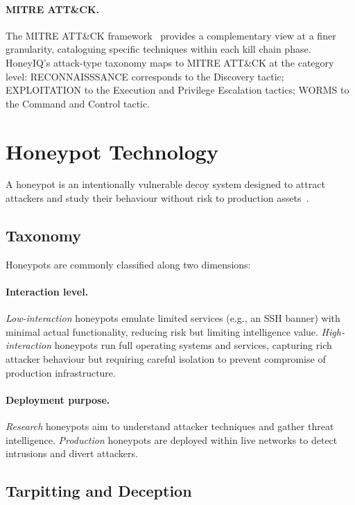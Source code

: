 \paragraph{MITRE ATT\&CK.}
The MITRE ATT\&CK framework~\citep{strom2018mitre} provides a complementary
view at a finer granularity, cataloguing specific techniques within each
kill chain phase.
HoneyIQ's attack-type taxonomy maps to MITRE ATT\&CK at the category level:
RECONNAISSSANCE corresponds to the Discovery tactic; EXPLOITATION to the
Execution and Privilege Escalation tactics; WORMS to the Command and
Control tactic.

\section{Honeypot Technology}
\label{sec:bg_honeypot}

A honeypot is an intentionally vulnerable decoy system designed to attract
attackers and study their behaviour without risk to production
assets~\citep{spitzner2003honeypot, cheswick1992evening}.

\subsection{Taxonomy}

Honeypots are commonly classified along two dimensions:

\paragraph{Interaction level.}
\emph{Low-interaction} honeypots emulate limited services (e.g., an SSH
banner) with minimal actual functionality, reducing risk but limiting
intelligence value.
\emph{High-interaction} honeypots run full operating systems and services,
capturing rich attacker behaviour but requiring careful isolation to prevent
compromise of production infrastructure.

\paragraph{Deployment purpose.}
\emph{Research} honeypots aim to understand attacker techniques and gather
threat intelligence.
\emph{Production} honeypots are deployed within live networks to detect
intrusions and divert attackers.

\subsection{Tarpitting and Deception}

